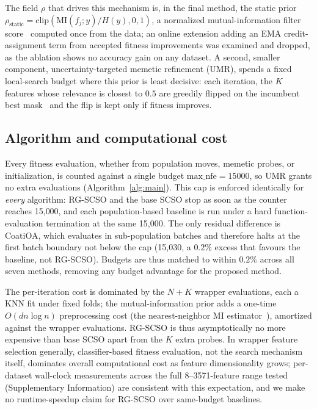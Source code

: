 \documentclass[iicol,sn-basic,pdflatex]{sn-jnl}
\begin{document}
The field $\rho$ that drives this mechanism is, in the final method, the
static prior $\rho_{\mathrm{static}}=\mathrm{clip}(\mathrm{MI}(f_j;y)/H(y),0,1)$,
a normalized mutual-information filter score~\cite{mrmr,kraskov} computed once
from the data; an online extension adding an EMA credit-assignment term from
accepted fitness improvements was examined and dropped, as the ablation
shows no accuracy gain on any dataset. A second, smaller component,
uncertainty-targeted memetic refinement (UMR), spends a fixed local-search
budget where this prior is least decisive: each iteration, the $K$ features
whose relevance is closest to $0.5$ are greedily flipped on the incumbent
best mask~\cite{neri} and the flip is kept only if fitness improves.

\subsection{Algorithm and computational cost}
Every fitness evaluation, whether from population moves, memetic probes, or
initialization, is counted against a single budget
$\mathrm{max\_nfe}=15000$, so UMR grants no extra evaluations
(Algorithm~\ref{alg:main}). This cap is enforced identically for \emph{every}
algorithm: RG-SCSO and the base SCSO stop as soon as the counter reaches
15{,}000, and each population-based baseline is run under a hard
function-evaluation termination at the same 15{,}000. The only residual
difference is CoatiOA, which evaluates in sub-population batches and therefore
halts at the first batch boundary not below the cap (15{,}030, a $0.2\%$
excess that favours the baseline, not RG-SCSO). Budgets are thus matched to
within $0.2\%$ across all seven methods, removing any budget advantage for the
proposed method.

The per-iteration cost is dominated by the $N+K$ wrapper evaluations, each a
KNN fit under fixed folds; the mutual-information prior adds a one-time
$O(dn\log n)$ preprocessing cost (the nearest-neighbor MI
estimator~\cite{kraskov}), amortized against the wrapper evaluations. RG-SCSO
is thus asymptotically no more expensive than base SCSO apart from the $K$
extra probes. In wrapper feature selection generally, classifier-based
fitness evaluation, not the search mechanism itself, dominates overall
computational cost as feature dimensionality grows; per-dataset wall-clock
measurements across the full 8--3571-feature range tested
(Supplementary Information) are consistent with this expectation, and we
make no runtime-speedup claim for RG-SCSO over same-budget baselines.
\end{document}
